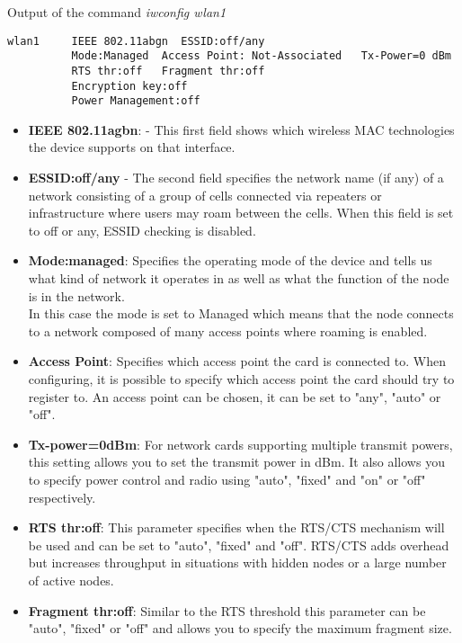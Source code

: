 Output of the command \textit{iwconfig wlan1}
\begin{verbatim}
wlan1     IEEE 802.11abgn  ESSID:off/any
          Mode:Managed  Access Point: Not-Associated   Tx-Power=0 dBm
          RTS thr:off   Fragment thr:off
          Encryption key:off
          Power Management:off
\end{verbatim}
\begin{itemize}
\item \textbf{IEEE 802.11agbn}: - This first field shows which wireless MAC technologies the device supports on that interface.\\
%
\item \textbf{ESSID:off/any}	- The second field specifies the network name (if any) of a network consisting of a group of cells connected via repeaters or infrastructure
 where users may roam between the cells. When this field is set to off or any, ESSID checking is disabled.\\
%
\item \textbf{Mode:managed}: Specifies the operating mode of the device and tells us what kind of network it operates in as well as what the function of the node is in the network.\\
In this case the mode is set to Managed which means that the node connects to a network composed of many access points where roaming is enabled.\\
%
\item \textbf{Access Point}: Specifies which access point the card is connected to. When configuring, it is possible to specify which access point the card should try to register to.
An access point can be chosen, it can be set to "any", "auto" or "off".
%
\item \textbf{Tx-power=0dBm}: For network cards supporting multiple transmit powers, this setting allows you to set the transmit power in dBm.
It also allows you to specify power control and radio using "auto", "fixed" and "on" or "off" respectively.\\
%
\item \textbf{RTS thr:off}: This parameter specifies when the RTS/CTS mechanism will be used and can be set to "auto", "fixed" and "off".
 RTS/CTS adds overhead but increases throughput in situations with hidden nodes or a large number of active nodes.\\
%
\item \textbf{Fragment thr:off}: Similar to the RTS threshold this parameter can be "auto", "fixed" or "off" and allows you to specify the maximum fragment size.

\end{itemize}
